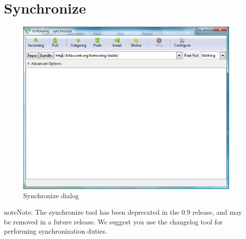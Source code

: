 \documentclass[letterpaper,10pt,english]{manual}
\begin{document}
\section{Synchronize}
\hypertarget{module-synchronize.dialog}{}
\begin{figure}[htbp]
\centering

\includegraphics{synchronize.png}
\caption{Synchronize dialog}\end{figure}

\begin{notice}{note}{Note:}
The synchronize tool has been deprecated in the 0.9 release, and may
be removed in a future release.  We suggest you use the changelog
tool for performing synchronization duties.
\end{notice}
\end{document}
